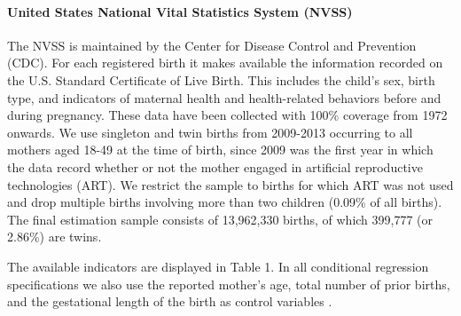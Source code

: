 \documentclass[12pt]{article}
\begin{document}
\paragraph{United States National Vital Statistics System (NVSS)}
The NVSS is maintained by the Center for Disease Control and Prevention (CDC). %
For each registered birth it makes available the information recorded on the U.S. Standard Certificate of Live Birth. This includes the child's sex, birth type, and indicators of maternal health and health-related behaviors before and during pregnancy. These data have been collected with 100\% coverage from 1972 onwards. We use singleton and twin births from 2009-2013 \cite{Martinetal2013} occurring to all mothers aged 18-49 at the time of birth, since 2009 was the first year in which the data record whether or not the mother engaged in artificial reproductive technologies (ART).%
We restrict the sample to births for which ART was not used and drop multiple births involving more than two children (0.09\% of all births). The final estimation sample consists of 13,962,330 births, of which 399,777 (or 2.86\%) are twins.
  

The available indicators are displayed in Table 1. In all conditional regression specifications we also use the reported mother's age, total number of prior births, and the gestational length of the birth as control variables \cite{Hall2003}.  %
  
\end{document}
